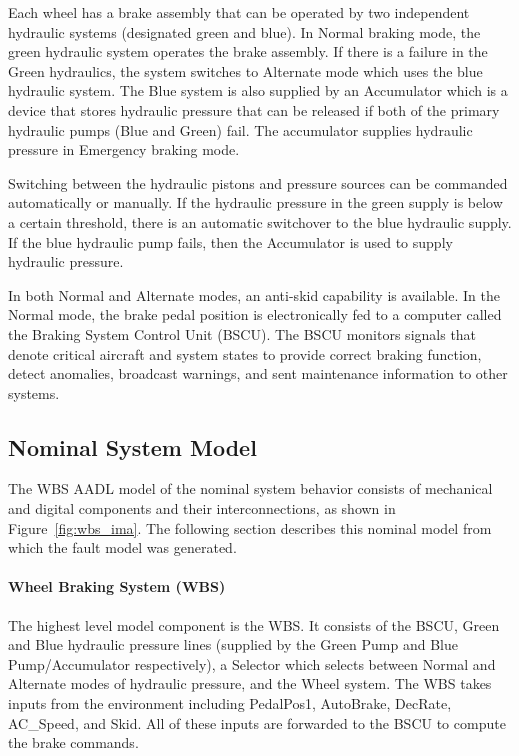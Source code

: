 Each wheel has a brake assembly that can be operated by two independent hydraulic systems (designated green and blue). In Normal braking mode, the green hydraulic system operates the brake assembly.  If there is a failure in the Green hydraulics, the system switches to Alternate mode which uses the blue hydraulic system.  The Blue system is also supplied by an Accumulator which is a device that stores hydraulic pressure that can be released if both of the primary hydraulic pumps (Blue and Green) fail. The accumulator supplies hydraulic pressure in Emergency braking mode.

Switching between the hydraulic pistons and pressure sources can be commanded automatically or manually. If the hydraulic pressure in the green supply is below a certain threshold, there is an automatic switchover to the blue hydraulic supply. If the blue hydraulic pump fails, then the Accumulator is used to supply hydraulic pressure.

In both Normal and Alternate modes, an anti-skid capability is available. In the Normal mode, the brake pedal position is electronically fed to a computer called the Braking System Control Unit (BSCU). The BSCU monitors signals that denote critical aircraft and system states to provide correct braking function, detect anomalies, broadcast warnings, and sent maintenance information to other systems.

\subsection{Nominal System Model}
\label{sec:nominal}
The WBS AADL model of the nominal system behavior consists of mechanical and digital components and their interconnections, as shown in Figure~\ref{fig:wbs_ima}. The following section describes this nominal model from which the fault model was generated.

\paragraph{Wheel Braking System (WBS)}
The highest level model component is the WBS. It consists of the BSCU, Green and Blue hydraulic pressure lines (supplied by the Green Pump and Blue Pump/Accumulator respectively), a Selector which selects between Normal and Alternate modes of hydraulic pressure, and the Wheel system. The WBS takes inputs from the environment including PedalPos1, AutoBrake, DecRate, AC\_Speed, and Skid. All of these inputs are forwarded to the BSCU to compute the brake commands.

